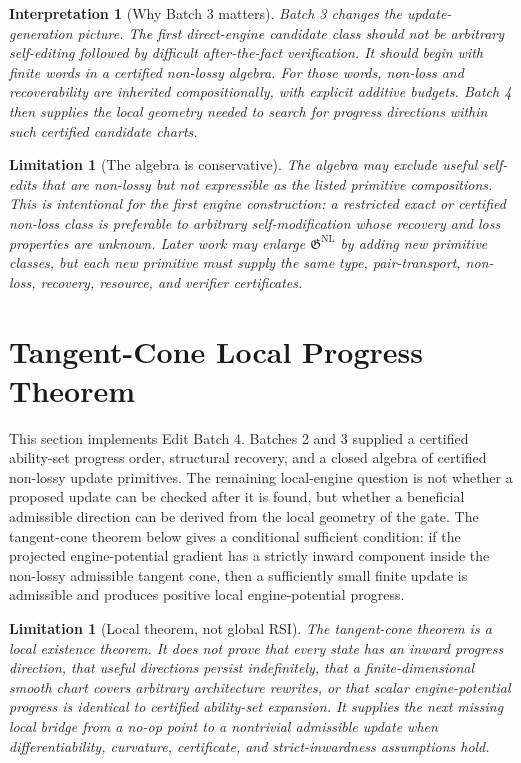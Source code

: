 \documentclass[11pt]{article}
\newtheorem{interpretation}[theorem]{Interpretation}
\newtheorem{limitation}[theorem]{Limitation}
\newcommand{\1}{\mathbf{1}}
\begin{document}
\begin{interpretation}[Why Batch 3 matters]
Batch 3 changes the update-generation picture.  The first direct-engine candidate class should not be arbitrary self-editing followed by difficult after-the-fact verification.  It should begin with finite words in a certified non-lossy algebra.  For those words, non-loss and recoverability are inherited compositionally, with explicit additive budgets.  Batch 4 then supplies the local geometry needed to search for progress directions within such certified candidate charts.
\end{interpretation}

\begin{limitation}[The algebra is conservative]
The algebra may exclude useful self-edits that are non-lossy but not expressible as the listed primitive compositions.  This is intentional for the first engine construction: a restricted exact or certified non-loss class is preferable to arbitrary self-modification whose recovery and loss properties are unknown.  Later work may enlarge \(\mathfrak G^{\mathrm{NL}}\) by adding new primitive classes, but each new primitive must supply the same type, pair-transport, non-loss, recovery, resource, and verifier certificates.
\end{limitation}


\section{Tangent-Cone Local Progress Theorem}
\label{sec:tangent_cone_local_progress}

This section implements Edit Batch 4.  Batches 2 and 3 supplied a certified ability-set progress order, structural recovery, and a closed algebra of certified non-lossy update primitives.  The remaining local-engine question is not whether a proposed update can be checked after it is found, but whether a beneficial admissible direction can be derived from the local geometry of the gate.  The tangent-cone theorem below gives a conditional sufficient condition: if the projected engine-potential gradient has a strictly inward component inside the non-lossy admissible tangent cone, then a sufficiently small finite update is admissible and produces positive local engine-potential progress.

\begin{limitation}[Local theorem, not global RSI]
The tangent-cone theorem is a local existence theorem.  It does not prove that every state has an inward progress direction, that useful directions persist indefinitely, that a finite-dimensional smooth chart covers arbitrary architecture rewrites, or that scalar engine-potential progress is identical to certified ability-set expansion.  It supplies the next missing local bridge from a no-op point to a nontrivial admissible update when differentiability, curvature, certificate, and strict-inwardness assumptions hold.
\end{limitation}
\end{document}
